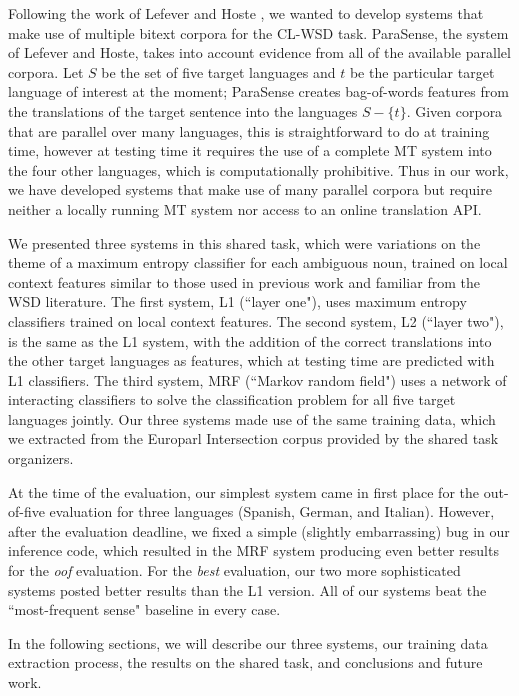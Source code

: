 \documentclass[11pt,letterpaper]{article}
\begin{document}
Following the work of Lefever and Hoste
, we wanted to develop systems
that make use of multiple bitext corpora for the CL-WSD task.  ParaSense, the
system of Lefever and Hoste, takes into account evidence from all of the
available parallel corpora. Let $S$ be the set of five target languages and $t$
be the particular target language of interest at the moment; ParaSense creates
bag-of-words features from the translations of the target sentence into the
languages $S - \lbrace{t \rbrace}$. Given corpora that are parallel over many
languages, this is straightforward to do at training time, however at testing
time it requires the use of a complete MT system into the four other languages,
which is computationally prohibitive. Thus in our work, we have developed
systems that make use of many parallel corpora but require neither a locally
running MT system nor access to an online translation API.

We presented three systems in this shared task, which were variations on the
theme of a maximum entropy classifier for each ambiguous noun, trained on local
context features similar to those used in previous work and familiar from the
WSD literature. The first system, L1 (``layer one"), uses maximum
entropy classifiers trained on local context features. The second system,
L2 (``layer two"), is the same as the L1 system, with the
addition of the correct translations into the other target languages as
features, which at testing time are predicted with L1 classifiers. The
third system, MRF (``Markov random field") uses a network of interacting
classifiers to solve the classification problem for all five target languages
jointly. Our three systems made use of the same training data, which we
extracted from the Europarl Intersection corpus provided by the shared task
organizers.

At the time of the evaluation, our simplest system came in first place for the
out-of-five evaluation for three languages (Spanish, German, and Italian).
However, after the evaluation deadline, we fixed a simple (slightly
embarrassing) bug in our inference code, which resulted in the MRF system
producing even better results for the \emph{oof} evaluation. For the \emph{best}
evaluation, our two more sophisticated systems posted better results than the
L1 version. All of our systems beat the ``most-frequent sense" baseline
in every case.

In the following sections, we will describe our three systems, our training
data extraction process, the results on the shared task, and conclusions and
future work.
\end{document}
